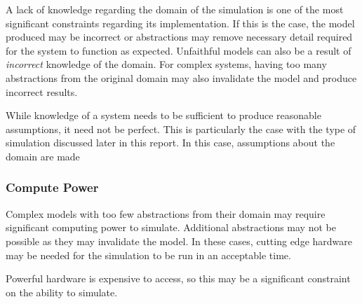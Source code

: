 \documentclass{UoYCSproject}
\begin{document}
A lack of knowledge regarding the domain of the simulation is one of the most significant constraints regarding its implementation.
If this is the case, the model produced may be incorrect or abstractions may remove necessary detail required for the system to function as expected.
Unfaithful models can also be a result of \textit{incorrect} knowledge of the domain.
For complex systems, having too many abstractions from the original domain may also invalidate the model and produce incorrect results\cite[p.8]{cosmos}.

While knowledge of a system needs to be sufficient to produce reasonable assumptions, it need not be perfect.
This is particularly the case with the type of simulation discussed later in this report.
In this case, assumptions about the domain are made %

\subsubsection{Compute Power}
Complex models with too few abstractions from their domain may require significant computing power to simulate. Additional abstractions may not be possible as they may invalidate the model. In these cases, cutting edge hardware may be needed for the simulation to be run in an acceptable time. 


Powerful hardware is expensive to access, so this may be a significant constraint on the ability to simulate.



\end{document}
